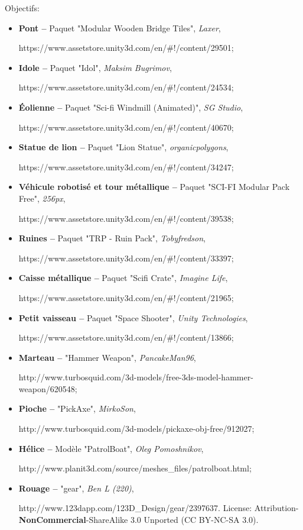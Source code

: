 	Objectifs:
	\begin{itemize}
		\item \textbf{Pont --} Paquet "Modular Wooden Bridge Tiles", \textit{Laxer}, 
		
		https://www.assetstore.unity3d.com/en/\#!/content/29501;
		
		\item \textbf{Idole --} Paquet "Idol", \textit{Maksim Bugrimov}, 
		
		https://www.assetstore.unity3d.com/en/\#!/content/24534;
		
		\item \textbf{Éolienne --} Paquet "Sci-fi Windmill (Animated)", \textit{SG Studio}, 
		
		https://www.assetstore.unity3d.com/en/\#!/content/40670;
		
		\item \textbf{Statue de lion --} Paquet "Lion Statue", \textit{organicpolygons}, 
		
		https://www.assetstore.unity3d.com/en/\#!/content/34247;
		
		\item \textbf{Véhicule robotisé et tour métallique -- } Paquet "SCI-FI Modular Pack Free", \textit{256px}, 
		
		https://www.assetstore.unity3d.com/en/\#!/content/39538;
		
		\item \textbf{Ruines --} Paquet "TRP - Ruin Pack", \textit{Tobyfredson}, 
		
		https://www.assetstore.unity3d.com/en/\#!/content/33397;
		
		\item \textbf{Caisse métallique --} Paquet "Scifi Crate", \textit{Imagine Life}, 
		
		https://www.assetstore.unity3d.com/en/\#!/content/21965;
		
		\item \textbf{Petit vaisseau --} Paquet "Space Shooter", \textit{Unity Technologies}, 
		
		https://www.assetstore.unity3d.com/en/\#!/content/13866;
		
		\item \textbf{Marteau --} "Hammer Weapon", \textit{PancakeMan96}, 
		
		http://www.turbosquid.com/3d-models/free-3ds-model-hammer-weapon/620548;
		
		\item \textbf{Pioche --} "PickAxe", \textit{MirkoSon}, 
		
		http://www.turbosquid.com/3d-models/pickaxe-obj-free/912027;
		
		\item \textbf{Hélice --} Modèle "PatrolBoat", \textit{Oleg Pomoshnikov}, 
		
		http://www.planit3d.com/source/meshes\_files/patrolboat.html;
		
		\item \textbf{Rouage --} "gear", \textit{Ben L (220)}, 
		
		http://www.123dapp.com/123D\_Design/gear/2397637. License: 
		Attribution-\textbf{NonCommercial}-ShareAlike 3.0 Unported (CC BY-NC-SA 3.0).	
	\end{itemize}
	
